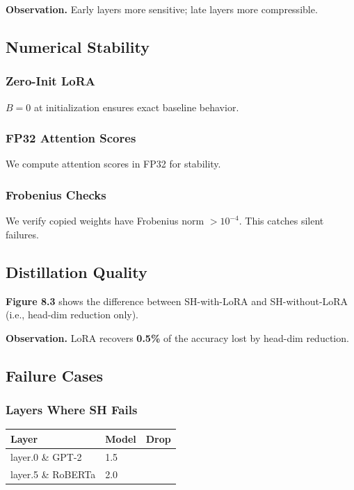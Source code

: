 \textbf{Observation.} Early layers more sensitive; late layers more compressible.

\subsection{Numerical Stability}

\subsubsection{Zero-Init LoRA}

$B = 0$ at initialization ensures exact baseline behavior.

\subsubsection{FP32 Attention Scores}

We compute attention scores in FP32 for stability.

\subsubsection{Frobenius Checks}

We verify copied weights have Frobenius norm $> 10^{-4}$. This catches 
silent failures.

\subsection{Distillation Quality}

\textbf{Figure 8.3} shows the difference between SH-with-LoRA and SH-without-LoRA 
(i.e., head-dim reduction only).

\textbf{Observation.} LoRA recovers \textbf{0.5\%} of the accuracy lost by 
head-dim reduction.

\subsection{Failure Cases}

\subsubsection{Layers Where SH Fails}

\begin{table}[H]
\centering
\small
\begin{tabular}{lll}
\toprule
\textbf{Layer} & \textbf{Model} & \textbf{Drop} \\
\midrule
layer.0 \& GPT-2 & 1.5 \\
layer.5 \& RoBERTa & 2.0 \\
\bottomrule
\end{tabular}
\end{table}

